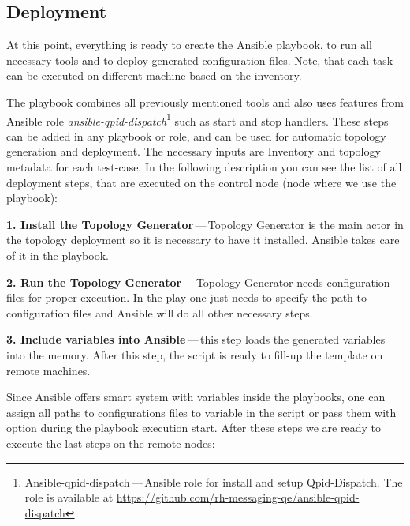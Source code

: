 \subsection{Deployment}
At this point, everything is ready to create the Ansible playbook, to run all necessary tools and to deploy generated configuration files. Note, that each task can be executed on different machine based on the inventory.

The playbook combines all previously mentioned tools and also uses features from Ansible role \emph{ansible-qpid-dispatch}\footnote{Ansible-qpid-dispatch\,---\,Ansible role for install
and setup Qpid-Dispatch. The role is available at \url{https://github.com/rh-messaging-qe/ansible-qpid-dispatch}} such as start and stop handlers. These steps can be added in any playbook or role, and can be used for automatic topology generation and deployment. The necessary inputs are Inventory and topology metadata for each test-case. In the following description you can see the list of all deployment steps, that are executed on the control node (node where we use the playbook):

\begin{description}
	\item \textbf{1. Install the Topology Generator}\,---\,Topology Generator is the main actor in the topology deployment so it is necessary to have it installed. Ansible takes care of it in the playbook.
	\item \textbf{2. Run the Topology Generator}\,---\,Topology Generator needs configuration files for proper execution. In the play one just needs to specify the path to configuration files and Ansible will do all other necessary steps.
	\item \textbf{3. Include variables into Ansible}\,---\,this step loads the generated variables into the memory. After this step, the script is ready to fill-up the template on remote machines.
\end{description}

Since Ansible offers smart system with variables inside the playbooks, one can assign all paths to configurations files to variable in the script or pass them with option during the playbook execution start. After these steps we are ready to execute the last steps on the remote nodes:

